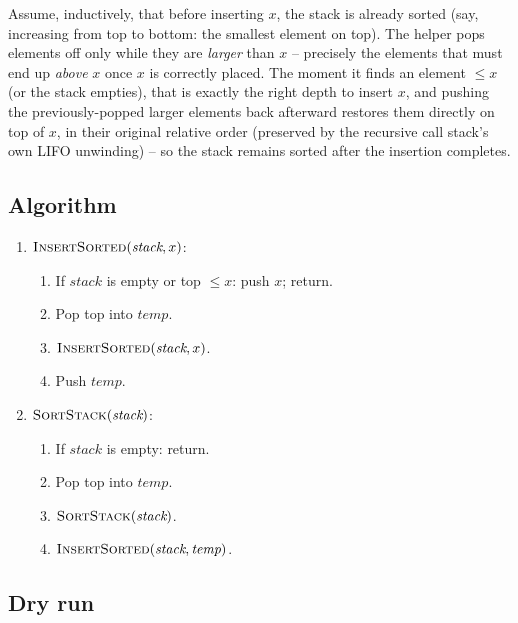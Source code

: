 Assume, inductively, that before inserting $x$, the stack is already
sorted (say, increasing from top to bottom: the smallest element on top).
The helper pops elements off only while they are \emph{larger} than $x$
-- precisely the elements that must end up \emph{above} $x$ once $x$ is
correctly placed. The moment it finds an element $\le x$ (or the stack
empties), that is exactly the right depth to insert $x$, and pushing the
previously-popped larger elements back afterward restores them directly
on top of $x$, in their original relative order (preserved by the
recursive call stack's own LIFO unwinding) -- so the stack remains
sorted after the insertion completes.

\subsection*{Algorithm}

\begin{enumerate}
  \item $\textsc{InsertSorted}(\textit{stack}, x)$:
  \begin{enumerate}
    \item If $\textit{stack}$ is empty or top $\le x$: push $x$; return.
    \item Pop top into $\textit{temp}$.
    \item $\textsc{InsertSorted}(\textit{stack}, x)$.
    \item Push $\textit{temp}$.
  \end{enumerate}
  \item $\textsc{SortStack}(\textit{stack})$:
  \begin{enumerate}
    \item If $\textit{stack}$ is empty: return.
    \item Pop top into $\textit{temp}$.
    \item $\textsc{SortStack}(\textit{stack})$.
    \item $\textsc{InsertSorted}(\textit{stack}, \textit{temp})$.
  \end{enumerate}
\end{enumerate}

\subsection*{Dry run}


